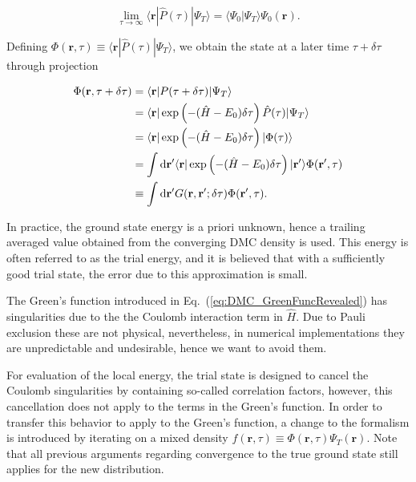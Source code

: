 \documentclass[amsmath, amssymb, aps, floatfix, nofootinbib, preprintnumbers,showpacs, superscriptaddress, twocolumn]{revtex4-1}
\newcommand{\D}{\operatorname{d\!}}
\newcommand{\ket}[1]{| #1 \rangle}
\newcommand{\bra}[1]{\langle #1 |}
\newcommand{\braket}[2]{\langle #1 | #2\rangle}
\begin{document}
\begin{equation}
 \label{eq:DMC_ExactProjection}
 \lim_{\tau\to\infty} \bra{\mathbf{r}}  \hat{P}(\tau) \ket{\Psi_T} = \braket{\Psi_0}{\Psi_T}\Psi_0(\mathbf{r}).
\end{equation}

Defining $\Phi(\mathbf{r}, \tau) \equiv \bra{\mathbf{r}}\hat{P}(\tau)\ket{\Psi_T}$, we obtain the state at a later time $\tau + \delta\tau$ through projection

\begin{align}
 \Phi(\mathbf{r}, \tau + \delta\tau) &= \bra{\mathbf{r}} P(\tau + \delta\tau) \ket{\Psi_T} \notag\\
 &= \bra{\mathbf{r}} \exp\left({-(\hat{H} - E_0)\delta\tau}\right) \hat{P}(\tau) \ket{\Psi_T} \notag\\
 &= \bra{\mathbf{r}} \exp\left({-(\hat{H} - E_0)\delta\tau}\right) \ket{\Phi(\tau)} \notag\\
 &= \int \D\mathbf{r}' \bra{\mathbf{r}} \exp\left({-(\hat{H} - E_0)\delta\tau}\right)\ket{\mathbf{r}'} \Phi(\mathbf{r}', \tau)\notag \\
 &\equiv \int \D\mathbf{r}' G(\mathbf{r}, \mathbf{r}'; \delta\tau) \Phi(\mathbf{r}', \tau). \label{eq:DMC_GreenFuncRevealed}
\end{align}

In practice, the ground state energy is a priori unknown, hence a trailing averaged value obtained from the converging DMC density is used. This energy is often referred to as the trial energy, and it is believed that with a sufficiently good trial state, the error due to this approximation is small.

The Green's function introduced in Eq.~(\ref{eq:DMC_GreenFuncRevealed}) has singularities due to the the Coulomb interaction term in $\hat{H}$. Due to Pauli exclusion these are not physical, nevertheless, in numerical implementations they are unpredictable and undesirable, hence we want to avoid them.

For evaluation of the local energy, the trial state is designed to cancel the Coulomb singularities by containing so-called correlation factors, however, this cancellation does not apply to the terms in the Green's function. In order to transfer this behavior to apply to the Green's function, a change to the formalism is introduced by iterating on a mixed density $f(\mathbf{r}, \tau) \equiv \Phi(\mathbf{r}, \tau)\Psi_T(\mathbf{r})$. Note that all previous arguments regarding convergence to the true ground state still applies for the new distribution.
\end{document}
